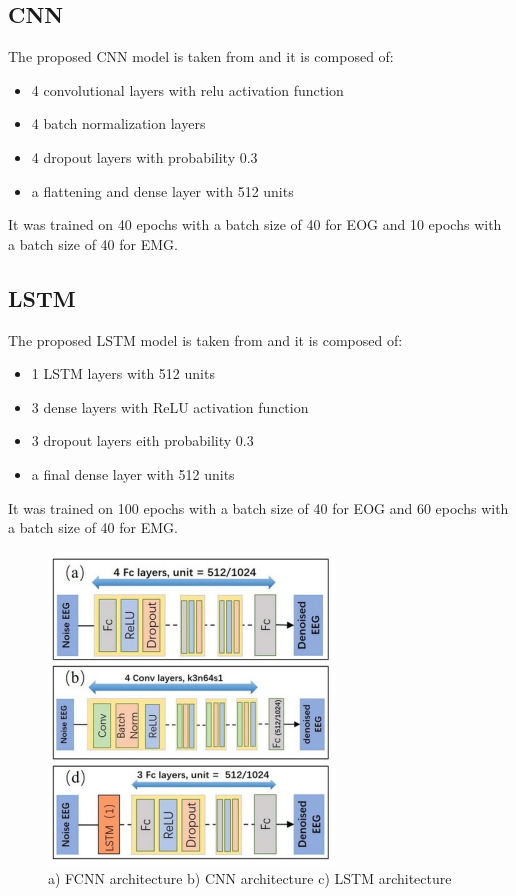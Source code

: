 \documentclass[a4paper, noexaminfo]{sapthesis}
\begin{document}
\subsection{CNN}\label{sec:model_cnn}
The proposed CNN model is taken from\cite{EEGdenoiseNet} and it is 
composed of: 
\begin{itemize}
\item 4 convolutional layers with relu activation function
\item 4 batch normalization layers
\item 4 dropout layers with probability 0.3
\item a flattening and dense layer with 512 units
\end{itemize}
It was trained on 40 epochs with a batch size of 40 for EOG and 
10 epochs with a batch size of 40 for EMG.
\subsection{LSTM}\label{sec:model_lstm}
The proposed LSTM model is taken from\cite{EEGdenoiseNet} and it is 
composed of: 
\begin{itemize}
\item 1 LSTM layers with 512 units
\item 3 dense layers with ReLU activation function
\item 3 dropout layers eith probability 0.3
\item a final dense layer with 512 units
\end{itemize}
It was trained on 100 epochs with a batch size of 40 for EOG and 
60 epochs with a batch size of 40 for EMG.
\begin{figure}
\centering
\includegraphics[width=0.6\linewidth]{images/models_architecture_basic.png}
\caption{a) FCNN architecture b) CNN architecture c) LSTM architecture}
\end{figure}
\end{document}

